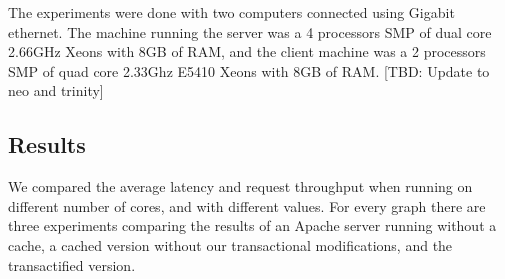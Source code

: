 \documentclass[preprint,natbib,11pt]{sigplanconf}
\begin{document}
The experiments were done with two computers connected using Gigabit ethernet.
The machine running the server was a 4 processors SMP of dual core 2.66GHz Xeons
with 8GB of RAM, and the client machine was a 2 processors SMP of quad core
2.33Ghz E5410 Xeons with 8GB of RAM. [TBD: Update to neo and trinity]

\subsection{Results} 
We compared the average latency and request throughput when running on different
number of cores, and with different  values. For every graph there are three
experiments comparing the results of an Apache server running without a cache, a
cached version without our transactional modifications, and the transactified
version. 
\end{document}

